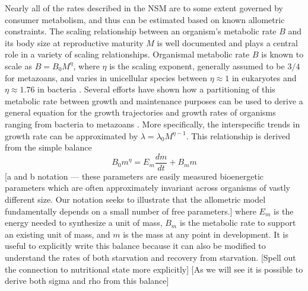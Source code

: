 \documentclass[12pt,english]{article}
\begin{document}
\begin{spacing}{1.9}
Nearly all of the rates described in the NSM are to some extent governed by consumer metabolism, and thus can be estimated based on known allometric constraints. 
The scaling relationship between an organism's metabolic rate $B$ and its body size at reproductive maturity $M$ is well documented \citep{West:2002it} and plays a central role in a variety of scaling relationships.
Organismal metabolic rate $B$ is known to scale as $B = B_0 M^\eta$, where $\eta$ is the scaling exponent, generally assumed to be $3/4$ for metazoans, and varies in unicellular species between $\eta\approx 1$ in eukaryotes and $\eta\approx 1.76$ in bacteria \citep{DeLong:2010dy}. Several efforts have shown how a partitioning of this metabolic rate between growth and maintenance purposes can be used to derive a general equation for the growth trajectories and growth rates of organisms ranging from bacteria to metazoans \citep{Kempes:2012hy}. More specifically, the interspecific trends in growth rate can be approximated by $\lambda = \lambda_0 M^{\eta-1}$. This relationship is derived from the simple balance
 \begin{equation}
 B_{0}m^{\eta}=E_{m}\frac{dm}{dt}+B_{m}m
 \label{balance}
 \end{equation}
 [a and b notation --- these parameters are easily measured bioenergetic parameters which are often approximately invariant across organisms of vastly different size. Our notation seeks to illustrate that the allometric model fundamentally depends on a small number of free parameters.]
 where $E_{m}$ is the energy needed to synthesize a unit of mass, $B_{m}$ is the metabolic rate to support an existing unit of mass, and $m$ is the mass at any point in development. It is useful to explicitly write this balance because it can also be modified to understand the rates of both starvation and recovery from starvation. [Spell out the connection to nutritional state more explicitly] [As we will see it is possible to derive both sigma and rho from this balance]
 

\end{spacing}
\end{document}
